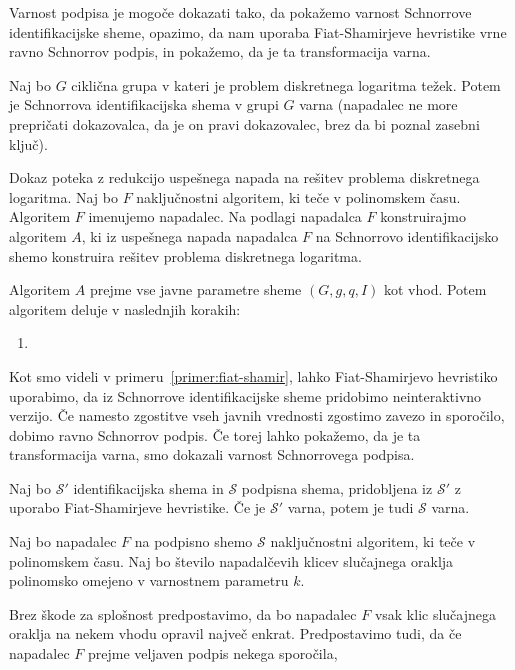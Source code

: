 \documentclass[isrm2, tisk]{fmfdelo}
\begin{document}
Varnost podpisa je mogoče dokazati tako, da pokažemo varnost Schnorrove identifikacijske sheme,
opazimo, da nam uporaba Fiat-Shamirjeve hevristike vrne ravno Schnorrov podpis, in pokažemo, da
je ta transformacija varna.

\begin{izrek}
    Naj bo $G$ ciklična grupa v kateri je problem diskretnega logaritma težek. Potem je Schnorrova
    identifikacijska shema v grupi $G$ varna (napadalec ne more prepričati dokazovalca, da je
    on pravi dokazovalec, brez da bi poznal zasebni ključ).
\end{izrek}

\begin{dokaz}
    Dokaz poteka z redukcijo uspešnega napada na rešitev problema diskretnega logaritma. Naj bo $F$
    naključnostni algoritem, ki teče v polinomskem času. Algoritem $F$ imenujemo napadalec. Na
    podlagi napadalca $F$ konstruirajmo algoritem $A$, ki iz uspešnega napada napadalca $F$ na
    Schnorrovo identifikacijsko shemo konstruira rešitev problema diskretnega logaritma.

    Algoritem $A$ prejme vse javne parametre sheme $(G, g, q, I)$ kot vhod. Potem algoritem deluje
    v naslednjih korakih:
    \begin{enumerate}
        \item 
    \end{enumerate}
\end{dokaz}

Kot smo videli v primeru~\ref{primer:fiat-shamir}, lahko Fiat-Shamirjevo hevristiko uporabimo, da
iz Schnorrove identifikacijske sheme pridobimo neinteraktivno verzijo. Če namesto zgostitve vseh
javnih vrednosti zgostimo zavezo in sporočilo, dobimo ravno Schnorrov podpis. Če torej lahko pokažemo,
da je ta transformacija varna, smo dokazali varnost Schnorrovega podpisa.

\begin{izrek}
    Naj bo $\mathcal{S'}$ identifikacijska shema in $\mathcal{S}$ podpisna shema, pridobljena iz
    $\mathcal{S'}$ z uporabo Fiat-Shamirjeve hevristike. Če je $\mathcal{S'}$ varna, potem je tudi
    $\mathcal{S}$ varna.
\end{izrek}

\begin{dokaz}
    Naj bo napadalec $F$ na podpisno shemo $\mathcal{S}$ naključnostni algoritem, ki teče v
    polinomskem času. Naj bo število napadalčevih klicev slučajnega oraklja polinomsko omejeno
    v varnostnem parametru $k$.

    Brez škode za splošnost predpostavimo, da bo napadalec $F$ vsak klic slučajnega oraklja na
    nekem vhodu opravil največ enkrat. Predpostavimo tudi, da če napadalec $F$ prejme veljaven
    podpis nekega sporočila, 
\end{dokaz}
\end{document}
